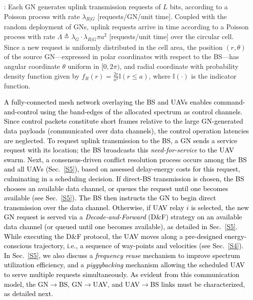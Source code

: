 \documentclass[12pt, draftcls, onecolumn]{IEEEtran}
\theoremstyle{plain}
\theoremstyle{definition}
\theoremstyle{remark}
\newcommand\hlt[1]{\textcolor{black}{#1}}
\begin{document}
\label{comm_model_label}
: Each GN generates uplink transmission requests of $L$ bits, according to a Poisson process with rate $\lambda_{R{|}G}$ [requests/GN/unit time]. Coupled with the random deployment of GNs, uplink requests arrive in time according to a Poisson process with rate $\Lambda{\triangleq}\lambda_{G}{\cdot}\lambda_{R{|}G}\pi a^{2}$ [requests/unit time] over the circular cell. Since a new request is uniformly distributed in the cell area, the position $(r,\theta)$ of the source GN---expressed in polar coordinates with respect to the BS---has angular coordinate $\theta$ uniform in $[0,2\pi)$, and radial coordinate with probability density function given by $f_{R}(r){=}\frac{2r}{a^2}\mathbb{I}(r{\leq}a)$, where $\mathbb{I}(\cdot)$ is the indicator function. 

\hlt{A fully-connected mesh network overlaying the BS and UAVs enables command-and-control using the band-edges of the allocated spectrum as control channels. Since control packets constitute short frames relative to the large GN-generated data payloads (communicated over data channels), the control operation latencies are neglected. To request uplink transmission to the BS, a GN sends a service request with its location; the BS broadcasts this \emph{need-for-service} to the UAV swarm. Next, a consensus-driven conflict resolution process occurs among the BS and all UAVs (Sec.~\ref{S5}), based on assessed delay-energy costs for this request, culminating in a scheduling decision. If direct-BS transmission is chosen, the BS chooses an available data channel, or queues the request until one becomes available (see Sec.~\ref{S5}). The BS then instructs the GN to begin direct transmission over the data channel. Otherwise, if UAV relay $i$ is selected, the new GN request is served via a \emph{Decode-and-Forward} (D\&F) strategy on an available data channel (or queued until one becomes available), as detailed in Sec.~\ref{S5}. While executing the D\&F protocol, the UAV moves along a pre-designed energy-conscious trajectory, i.e., a sequence of way-points and velocities (see Sec.~\ref{S4}). In Sec.~\ref{S5}, we also discuss a \emph{frequency reuse} mechanism to improve spectrum utilization efficiency, and a \emph{piggybacking} mechanism allowing the scheduled UAV to serve multiple requests simultaneously. As evident from this communication model, the GN$\rightarrow$BS, GN$\rightarrow$UAV, and UAV$\rightarrow$BS links must be characterized, as detailed next.}
\end{document}
